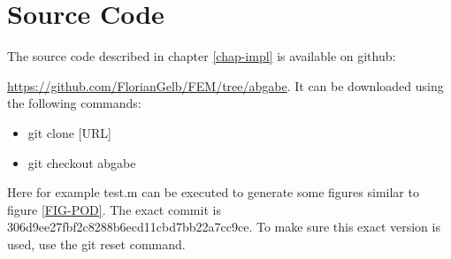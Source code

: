 \pagebreak
\section{Source Code}
The source code described in chapter \ref{chap-impl} is available on github:

\href{https://github.com/FlorianGelb/FEM/tree/abgabe}{https://github.com/FlorianGelb/FEM/tree/abgabe}.
It can be downloaded using the following commands:
\begin{itemize}
 \item git clone [URL]
 \item git checkout abgabe
\end{itemize}
Here for example test.m can be executed to generate some figures similar to figure \ref{FIG-POD}.
The exact commit is 306d9ee27fbf2c8288b6ecd11cbd7bb22a7cc9ce.
To make sure this exact version is used, use the git reset command.


